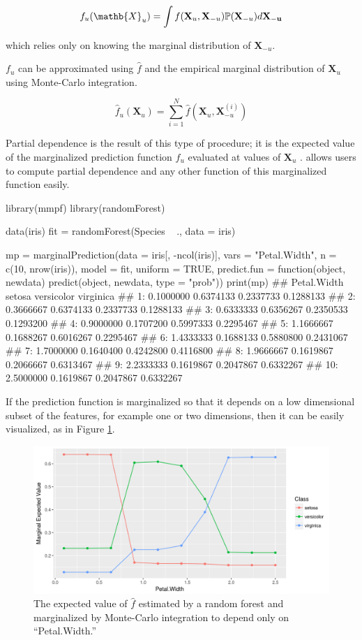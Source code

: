 $$f_{u}(\mathb{X}_{u}) = \int f(\mathbf{X}_{u}, \mathbf{X}_{-u}) \mathbb{P}(\mathbf{X}_{-u}) d \mathbf{X_{-u}}$$

which relies only on knowing the marginal distribution of $\mathbf{X}_{-u}$.

$f_u$ can be approximated using $\hat{f}$ and the empirical marginal distribution of $\mathbf{X}_u$ using Monte-Carlo integration.

$$\hat{f}_u (\mathbf{X}_u) = \sum_{i = 1}^N \hat{f} (\mathbf{X}_u, \mathbf{X}_{-u}^{(i)})$$

Partial dependence is the result of this type of procedure; it is the expected value of the marginalized prediction function $\hat{f}_u$ evaluated at values of $\mathbf{X}_u$ \cite{friedman2001greedy}.  allows users to compute partial dependence and any other function of this marginalized function easily.

\begin{example}
  library(mmpf)
  library(randomForest)
  
  data(iris)
  fit = randomForest(Species ~ ., data = iris)

  mp = marginalPrediction(data = iris[, -ncol(iris)],
    vars = "Petal.Width",
    n = c(10, nrow(iris)), model = fit, uniform = TRUE,
    predict.fun = function(object, newdata) predict(object, newdata, type = "prob"))
  print(mp)
  ##     Petal.Width    setosa versicolor virginica
  ##  1:   0.1000000 0.6374133  0.2337733 0.1288133
  ##  2:   0.3666667 0.6374133  0.2337733 0.1288133
  ##  3:   0.6333333 0.6356267  0.2350533 0.1293200
  ##  4:   0.9000000 0.1707200  0.5997333 0.2295467
  ##  5:   1.1666667 0.1688267  0.6016267 0.2295467
  ##  6:   1.4333333 0.1688133  0.5880800 0.2431067
  ##  7:   1.7000000 0.1640400  0.4242800 0.4116800
  ##  8:   1.9666667 0.1619867  0.2066667 0.6313467
  ##  9:   2.2333333 0.1619867  0.2047867 0.6332267
  ## 10:   2.5000000 0.1619867  0.2047867 0.6332267
\end{example}

If the prediction function is marginalized so that it depends on a low dimensional subset of the features, for example one or two dimensions, then it can be easily visualized, as in Figure \ref{figure:mp}.

\begin{figure}
  \includegraphics[width=\textwidth]{mp.png}
  \caption{The expected value of $\hat{f}$ estimated by a random forest and marginalized by Monte-Carlo integration to depend only on ``Petal.Width.'' \label{figure:mp}}
\end{figure}

